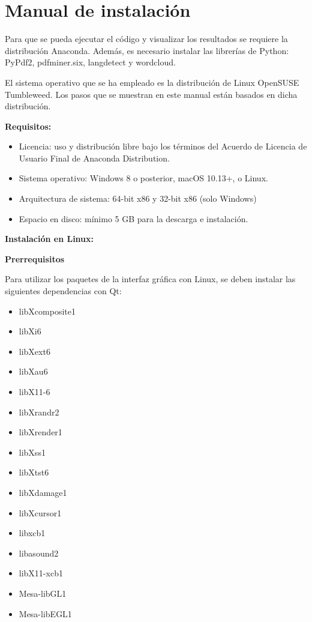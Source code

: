 \documentclass[../main.tex]{subfiles}
\begin{document}
\section{Manual de instalación}

Para que se pueda ejecutar el código y visualizar los resultados se requiere la distribución Anaconda.
Además, es necesario instalar las librerías de Python: PyPdf2, pdfminer.six, langdetect y wordcloud.

El sistema operativo que se ha empleado es la distribución de Linux OpenSUSE Tumbleweed. Los pasos que se muestran en este manual están basados en dicha distribución.

\textbf{\large{Requisitos:}}

\begin{itemize}
	\item Licencia: uso y distribución libre bajo los términos del Acuerdo de Licencia de Usuario Final de Anaconda Distribution.
	\item Sistema operativo: Windows 8 o posterior, macOS 10.13+, o Linux.
	\item Arquitectura de sistema: 64-bit x86 y 32-bit x86 (solo Windows)
	\item Espacio en disco: mínimo 5 GB para la descarga e instalación.
\end{itemize}

\textbf{\large{Instalación en Linux:}}

\textbf{Prerrequisitos}

Para utilizar los paquetes de la interfaz gráfica con Linux, se deben instalar las siguientes dependencias con Qt:

\begin{itemize}
	\renewcommand\labelitemi{--}
	\setlength\itemsep{-1em}
	\item libXcomposite1
	\item libXi6
	\item libXext6
	\item libXau6
	\item libX11-6
	\item libXrandr2
	\item libXrender1
	\item libXss1
	\item libXtst6
	\item libXdamage1
	\item libXcursor1
	\item libxcb1
	\item libasound2
	\item libX11-xcb1
	\item Mesa-libGL1
	\item Mesa-libEGL1
\end{itemize}
\end{document}

